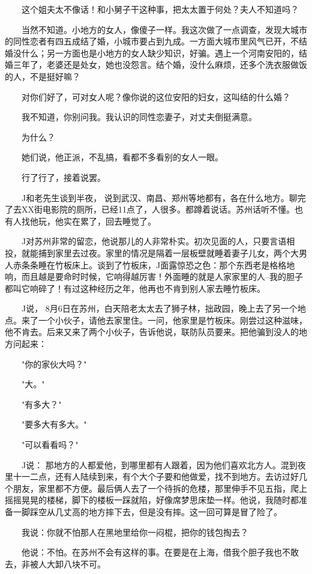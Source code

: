  　　这个姐夫太不像话！和小舅子干这种事，把太太置于何处？夫人不知道吗？ 
 
 　　当然不知道。小地方的女人，像傻子一样。我这次做了一点调查，发现大城市的同性恋者有四五成结了婚，小城市要占到九成。一方面大城市里风气已开，不结婚没什么；另一方面也是小地方的女人缺少知识，好骗。遇上一个河南安阳的，结婚三年了，老婆还是处女，她也没怨言。结个婚，没什么麻烦，还多个洗衣服做饭的人，不是挺好嘛？ 
 
 　　对你们好了，可对女人呢？像你说的这位安阳的妇女，这叫结的什么婚？ 
 
 　　我不知道，你别问我。我认识的同性恋妻子，对丈夫倒挺满意。 
 
 　　为什么？ 
 
 　　她们说，他正派，不乱搞，看都不多看别的女人一眼。 
 
 　　行了行了，接着说罢。 
 
 　　J和老先生谈到半夜， 说到武汉、南昌、郑州等地都有，各在什么地方。聊完了去XX街电影院的厕所，已经11点了，人很多。都蹲着说话。苏州话听不懂。也有人找他玩，他实在累了，回去睡觉了。 
 
 　　J对苏州非常的留恋，他说那儿的人非常朴实。初次见面的人，只要言语相投，就能捕到家里去过夜。家里的情况是隔着一层板壁就睡着妻子儿女，两个大男人赤条条睡在竹板床上。谈到了竹板床，J面露惊恐之色：那个东西老是格格地响，而且越是要命时时候，它响得越厉害！外面睡的就是人家家里的人--我的胆子都叫它响碎了！有过这种经历之年，他再也不肯到别人家去睡竹板床。 
 
 　　J说， 8月6日在苏州，白天陪老太太去了狮子林，拙政园，晚上去了另一个地点。来了一个小伙子，请他去家里住。一问，他家里是竹板床。刚尝过这种滋味，他不肯去。后来又来了两个小伙子，告诉他说，联防队员要来。把他骗到没人的地方问起来： 
 
 　　"你的家伙大吗？" 
 
 　　"大。" 
 
 　　"有多大？" 
 
 　　"要多大有多大。" 
 
 　　"可以看看吗？" 
 
 　　J说： 那地方的人都爱他，到哪里都有人跟着，因为他们喜欢北方人。混到夜里十一二点，还有人陆续到来，有个大个子要和他做爱，找不到地方。去访过好几个朋友，家里都不方便。最后俩人去了一个待拆的危楼，那里伸手不见五指，爬上摇摇晃晃的楼梯，脚下的楼板一踩就陷，好像席梦思床垫一样。他说，我随时都准备一脚踩空从几丈高的地方摔下去，但是没有摔。这一回可算是冒了险了。 
 
 　　我说：你就不怕那人在黑地里给你一闷棍，把你的钱包掏去？ 
 
 　　他说：不怕。在苏州不会有这样的事。在要是在上海，借我个胆子我也不敢去，非被人大卸八块不可。 
 
